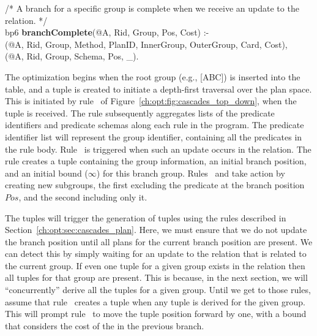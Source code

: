 \begin{figure*}
\begin{boxedminipage}{\linewidth}
/* A branch for a specific group is complete when we receive an update to the  \\
    relation. */ \\
bp6 {\bf branchComplete}(@A, Rid, Group, Pos, Cost) :- \\
(@A, Rid, Group, Method, PlanID, InnerGroup, OuterGroup, Card, Cost), \\
(@A, Rid, Group, Schema, Pos, \_). \\
  
\end{boxedminipage}
\caption{\label{ch:opt:fig:cascades_top_down} Cascades top-down search strategy rules.}
\end{figure*}

The optimization begins when the root group (e.g., [ABC]) is inserted into the
 table, and a  tuple is created to initiate a depth-first
traversal over the plan space.  This is initiated by rule~ of
Figure~\ref{ch:opt:fig:cascades_top_down}, when the 
tuple is received.  The rule subsequently aggregates lists of the predicate
identifiers and predicate schemas along each rule in the program.  The
predicate identifier list will represent the group identifier, containing all
the predicates in the rule body.  Rule~ is triggered when such an
update occurs in the  relation.  The rule creates a  tuple
containing the group information, an initial branch position, and an initial
bound ($\infty$) for this branch group.  Rules~ and  take
action by creating new subgroups, the first excluding the predicate at the
branch position $Pos$, and the second including only it.

The  tuples will trigger the generation of  tuples using
the rules described in Section~\ref{ch:opt:sec:cascades_plan}.  Here, we must
ensure that we do not update the branch position until all plans for the
current branch position are present.  We can detect this by simply waiting for
an update to the  relation that is related to the current 
group.  If even one  tuple for a given group exists in the 
relation then all  tuples for that group are present.  This is
because, in the next section, we will ``concurrently'' derive all the 
tuples for a given group.  Until we get to those rules, assume that
rule~ creates a  tuple when any  tuple is
derived for the given group.  This will prompt rule~ to move the
 tuple position forward by one, with a bound that considers the
cost of the  in the previous branch.

